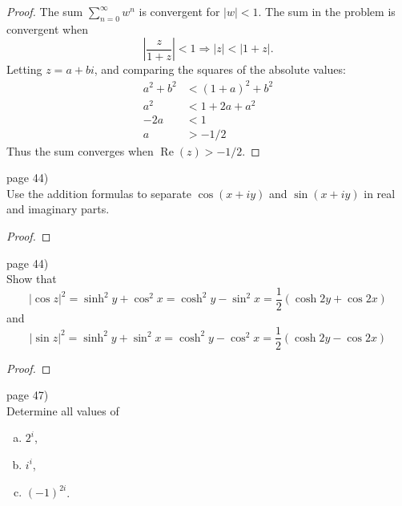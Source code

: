 \documentclass{article}
\newenvironment{problem}[2][Problem]{\begin{trivlist}
\item[\hskip \labelsep {\bfseries #1}\hskip \labelsep {\bfseries #2.}]}{\end{trivlist}}
\begin{document}
\begin{proof}
  The sum $\sum_{n = 0}^\infty w^n$ is convergent for $|w| < 1$.
  The sum in the problem is convergent when \[
    \left|\frac{z}{1 + z}\right| < 1 \Longrightarrow |z| < |1 + z|.
  \]
  Letting $z = a + bi$, and comparing the squares of the absolute values: \begin{align*}
    a^2 + b^2 &< (1 + a)^2 + b^2 \\
    a^2 &< 1 + 2a + a^2 \\
    -2a &< 1 \\
    a &> -1/2
  \end{align*}
  Thus the sum converges when $\operatorname{Re}(z) > -1/2$.
\end{proof}

\pagebreak

\begin{problem}{3} (page 44) \\
  Use the addition formulas to separate
    $\cos(x + iy)$ and $\sin(x + iy)$
    in real and imaginary parts.
\end{problem}

\begin{proof}
\end{proof}

\pagebreak

\begin{problem}{4} (page 44) \\
  Show that \[
    |\cos z|^2
    = \sinh^2 y + \cos^2 x
    = \cosh^2 y - \sin^2 x
    = \frac{1}{2}(\cosh 2y + \cos 2x)
  \] and \[
    |\sin z|^2
    = \sinh^2 y + \sin^2 x
    = \cosh^2 y - \cos^2 x
    = \frac{1}{2}(\cosh 2y - \cos 2x)
  \]
\end{problem}

\begin{proof}
\end{proof}

\pagebreak

\begin{problem}{6} (page 47) \\
  Determine all values of \begin{enumerate}[(a)]
    \item $2^i$,
    \item $i^i$,
    \item $(-1)^{2i}$.
  \end{enumerate}
\end{problem}
\end{document}
